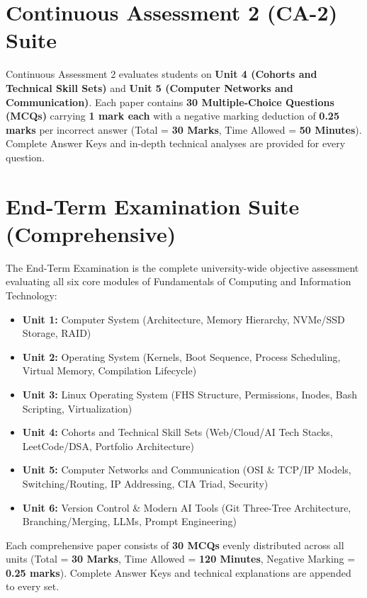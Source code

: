 \documentclass[a4paper,11pt,oneside,openany]{book}
\begin{document}
\newpage





\chapter{Continuous Assessment 2 (CA-2) Suite}
\label{chap:ca2}
\noindent
Continuous Assessment 2 evaluates students on \textbf{Unit 4 (Cohorts and Technical Skill Sets)} and \textbf{Unit 5 (Computer Networks and Communication)}. Each paper contains \textbf{30 Multiple-Choice Questions (MCQs)} carrying \textbf{1 mark each} with a negative marking deduction of \textbf{0.25 marks} per incorrect answer (Total = \textbf{30 Marks}, Time Allowed = \textbf{50 Minutes}). Complete Answer Keys and in-depth technical analyses are provided for every question.

\newpage





\chapter{End-Term Examination Suite (Comprehensive)}
\label{chap:endterm}
\noindent
The End-Term Examination is the complete university-wide objective assessment evaluating all six core modules of Fundamentals of Computing and Information Technology:
\begin{itemize}[leftmargin=8mm]
    \item \textbf{Unit 1:} Computer System (Architecture, Memory Hierarchy, NVMe/SSD Storage, RAID)
    \item \textbf{Unit 2:} Operating System (Kernels, Boot Sequence, Process Scheduling, Virtual Memory, Compilation Lifecycle)
    \item \textbf{Unit 3:} Linux Operating System (FHS Structure, Permissions, Inodes, Bash Scripting, Virtualization)
    \item \textbf{Unit 4:} Cohorts and Technical Skill Sets (Web/Cloud/AI Tech Stacks, LeetCode/DSA, Portfolio Architecture)
    \item \textbf{Unit 5:} Computer Networks and Communication (OSI \& TCP/IP Models, Switching/Routing, IP Addressing, CIA Triad, Security)
    \item \textbf{Unit 6:} Version Control \& Modern AI Tools (Git Three-Tree Architecture, Branching/Merging, LLMs, Prompt Engineering)
\end{itemize}
Each comprehensive paper consists of \textbf{30 MCQs} evenly distributed across all units (Total = \textbf{30 Marks}, Time Allowed = \textbf{120 Minutes}, Negative Marking = \textbf{0.25 marks}). Complete Answer Keys and technical explanations are appended to every set.

\newpage




\end{document}
